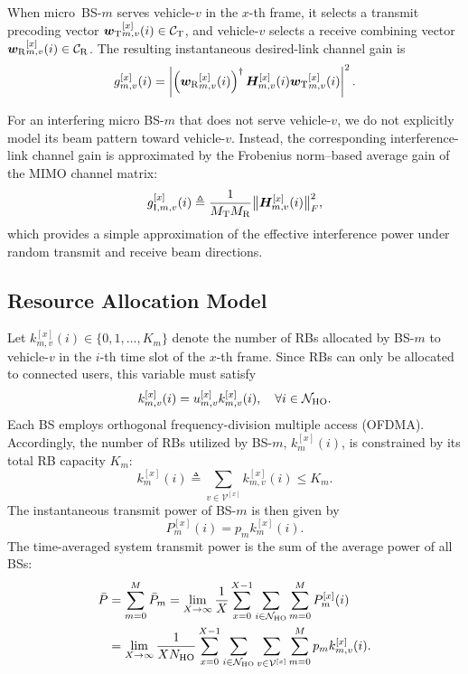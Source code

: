 \documentclass[conference, a4paper]{IEEEtran}
\theoremstyle{remark}
\begin{document}
When micro~BS-$m$ serves vehicle-$v$ in the $x$-th frame, it selects a transmit precoding vector ${\bm{w}_{\rm T}}_{m,v}^{[x]}(i) \in \mathcal{C}_{\rm T}$, and vehicle-$v$ selects a receive combining vector ${\bm{w}_{\rm R}}_{m,v}^{[x]}(i) \in \mathcal{C}_{\rm R}$. The resulting
instantaneous {desired-link} channel gain is
\begin{equation}
\label{eq:mimo_instant_gain}
    g_{m,v}^{[x]}(i) = \left| \left({\bm{w}_{\rm R}}_{m,v}^{[x]}(i)\right)^{\dagger} \boldsymbol{H}_{m,v}^{[x]}(i) {\bm{w}_{\rm T}}_{m,v}^{[x]} (i)\right|^2.
\end{equation}

For an interfering micro BS-$m$ that does not serve vehicle-$v$, we do not explicitly model its beam pattern toward vehicle-$v$. Instead, the corresponding {interference-link} channel gain is approximated by the Frobenius norm–based average gain of the MIMO channel matrix:
\begin{equation}
\label{eq:mimo_instant_gain_interference}
    g_{{\rm I},m,v}^{[x]}(i)
    \triangleq
    \frac{1}{M_{\rm T} M_{\rm R}}
    \bigl\| \boldsymbol{H}_{m,v}^{[x]}(i) \bigr\|_{F}^{2},
\end{equation}
which provides a simple approximation of the effective interference power under
random transmit and receive beam directions.


\subsection{Resource Allocation Model}

Let $k_{m,v}^{[x]}(i) \in \{0,1,\dots,K_m\}$ denote the number of RBs allocated by BS-$m$ to vehicle-$v$ in the $i$-th time slot of the $x$-th frame. Since RBs can only be allocated to connected users, this variable must satisfy
\begin{equation}
    k_{m,v}^{[x]}(i) = u_{m,v}^{[x]}k_{m,v}^{[x]}(i), \quad \forall i \in \mathcal{N}_{\rm HO}.
    \label{eq:resource allocation cons}
\end{equation}
Each BS employs orthogonal frequency-division multiple access (OFDMA). Accordingly, the number of RBs utilized by BS-$m$, $k_{m}^{[x]}(i)$, is constrained by its total RB capacity $K_m$:
\begin{equation}
    k_{m}^{[x]}(i) \triangleq \sum_{v\in\mathcal{V}^{[x]}} k_{m,v}^{[x]}(i) \leq K_m.
    \label{eq:RB cons}
\end{equation}
The instantaneous transmit power of BS-$m$ is then given by
\begin{equation}
    P_m^{[x]}(i) = p_m k_{m}^{[x]}(i).
    \label{eq:BS instant power cons}
\end{equation}
The time-averaged system transmit power is the sum of the average power of all BSs:
\begin{align}
    \bar{P} & = \sum_{m=0}^M \bar{P}_m =\lim_{X\to\infty}\frac{1}{X} \sum_{x=0}^{X-1}\sum_{i \in \mathcal{N}_{\rm HO}} \sum_{m=0}^MP_m^{[x]}(i) \nonumber \\
    &=\lim_{X\to\infty}\frac{1}{XN_{\rm HO}}\sum_{x=0}^{X-1}\sum_{i \in \mathcal{N}_{\rm HO}}  \sum_{v\in\mathcal{V}^{[x]}} \sum_{m=0}^M p_m  k_{m,v}^{[x]}(i).
    \label{eq:area timeavg power cons}
\end{align}
\end{document}
